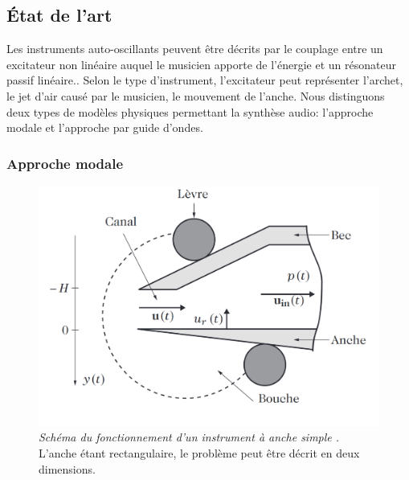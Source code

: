 \subsection{État de l'art}

Les instruments auto-oscillants peuvent être décrits par le couplage entre un excitateur non linéaire auquel le musicien apporte de l'énergie et un résonateur passif linéaire.\cite{mcintyre_oscillations_1983}. Selon le type d'instrument, l'excitateur peut représenter l'archet, le jet d'air causé par le musicien, le mouvement de l'anche. Nous distinguons deux types de modèles physiques permettant la synthèse audio: l'approche modale et l'approche par guide d'ondes.


\subsubsection{Approche modale} \label{sec:approche_modale}

\begin{figure}
    \centering
    \includegraphics[scale=.38]{img/schema_chaigne.png}
    \caption{\textit{Schéma du fonctionnement d'un instrument à anche simple \cite{chaigne2008acoustique}.} L'anche étant rectangulaire, le problème peut être décrit en deux dimensions.}
    \label{fig:schema_chaigne}
\end{figure}


